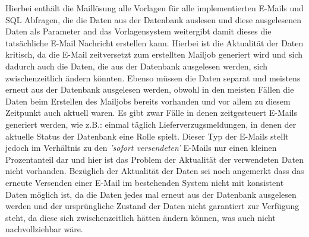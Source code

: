 Hierbei enthält die Maillösung alle Vorlagen für alle implementierten E-Mails und SQL Abfragen, die die Daten aus der Datenbank auslesen und diese ausgelesenen Daten als Parameter and das Vorlagensystem weitergibt damit dieses die tatsächliche E-Mail Nachricht erstellen kann. Hierbei ist die Aktualität der Daten kritisch, da die E-Mail zeitversetzt zum erstellten Mailjob generiert wird und sich dadurch auch die Daten, die aus der Datenbank ausgelesen werden, sich zwischenzeitlich ändern könnten. Ebenso müssen die Daten separat und meistens erneut aus der Datenbank ausgelesen werden, obwohl in den meisten Fällen die Daten beim Erstellen des Mailjobs bereits vorhanden und vor allem zu diesem Zeitpunkt auch aktuell waren. Es gibt zwar Fälle in denen zeitgesteuert E-Mails generiert werden, wie z.B.: einmal täglich Lieferverzugsmeldungen, in denen der aktuelle Status der Datenbank eine Rolle spielt. Dieser Typ der E-Mails stellt jedoch im Verhältnis zu den \emph{'sofort versendeten'} E-Mails nur einen kleinen Prozentanteil dar und hier ist das Problem der Aktualität der verwendeten Daten nicht vorhanden. Bezüglich der Aktualität der Daten sei noch angemerkt dass das erneute Versenden einer E-Mail im bestehenden System nicht mit konsistent Daten möglich ist, da die Daten jedes mal erneut aus der Datenbank ausgelesen werden und der ursprüngliche Zustand der Daten nicht garantiert zur Verfügung steht, da diese sich zwischenzeitlich hätten ändern können, was auch nicht nachvollziehbar wäre.
